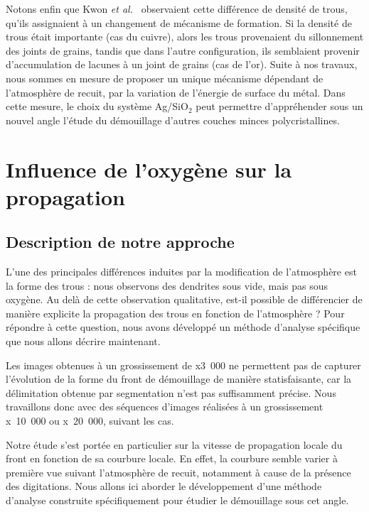 Notons enfin que Kwon \textit{et al.}~\cite{kwon2003comparison} observaient cette différence de densité de trous, qu'ils assignaient à un changement de mécanisme de formation. Si la densité de trous était importante (cas du cuivre), alors les trous provenaient du sillonnement des joints de grains, tandis que dans l'autre configuration, ils semblaient provenir d'accumulation de lacunes à un joint de grains (cas de l'or). Suite à nos travaux, nous sommes en mesure de proposer un unique mécanisme dépendant de l'atmosphère de recuit, par la variation de l'énergie de surface du métal. Dans cette mesure, le choix du système Ag/SiO$_2$ peut permettre d'appréhender sous un nouvel angle l'étude du démouillage d'autres couches minces polycristallines.\par 
\section{Influence de l'oxygène sur la propagation}
		\subsection{Description de notre approche}
L'une des principales différences induites par la modification de l'atmosphère est la forme des trous : nous observons des dendrites sous vide, mais pas sous oxygène. Au delà de cette observation qualitative, est-il possible de différencier de manière explicite la propagation des trous en fonction de l'atmosphère ? Pour répondre à cette question, nous avons développé un méthode d'analyse spécifique que nous allons décrire maintenant.\par 
Les images obtenues à un grossissement de x3~000 ne permettent pas de capturer l'évolution de la forme du front de démouillage de manière statisfaisante, car la délimitation  obtenue par segmentation n'est pas suffisamment précise. Nous travaillons donc avec des séquences d'images réalisées à un grossissement x~10~000 ou x~20~000, suivant les cas.\par 
Notre étude s'est portée en particulier sur la vitesse de propagation locale du front en fonction de sa courbure locale. En effet, la courbure semble varier à première vue suivant l'atmosphère de recuit, notamment à cause de la présence des digitations. Nous allons ici aborder le développement d'une méthode d'analyse construite spécifiquement pour étudier le démouillage sous cet angle.\par 

